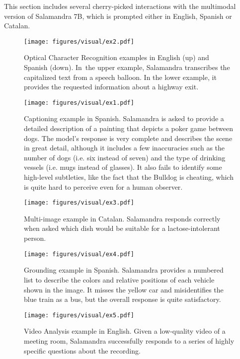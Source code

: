 This section includes several cherry-picked interactions with the multimodal version of Salamandra 7B, which is prompted either in English, Spanish or Catalan.

\begin{figure}[htp]
    \centering
    \texttt{[image: figures/visual/ex2.pdf]}
    \caption{Optical Character Recognition examples in English (up) and Spanish (down). \hbox{In the} upper example, Salamandra transcribes the capitalized text from a speech balloon. In the lower example, it provides the requested information about a highway exit.}
    \label{fig:visual_ex2}
\end{figure}

\begin{figure}[htp]
    \centering
    \texttt{[image: figures/visual/ex1.pdf]}
    \caption{Captioning example in Spanish. Salamandra is asked to provide a detailed description of a painting that depicts a poker game between dogs. The model's response is very complete and describes the scene in great detail, although it includes a few inaccuracies such as the number of dogs (i.e. six instead of seven) and the type of drinking vessels (i.e. mugs instead of glasses). It also fails to identify some high-level subtleties, like the fact that the Bulldog is cheating, which is quite hard to perceive even for a human observer.}
    \label{fig:visual_ex1}
\end{figure}

\begin{figure}[htp]
    \centering
    \texttt{[image: figures/visual/ex3.pdf]}
    \caption{Multi-image example in Catalan. Salamandra responds correctly when asked which dish would be suitable for a lactose-intolerant person.}
    \label{fig:visual_ex3}
\end{figure}

\begin{figure}[htp]
    \centering
    \texttt{[image: figures/visual/ex4.pdf]}
    \caption{Grounding example in Spanish. Salamandra provides a numbered list to describe the colors and relative positions of each vehicle shown in the image. It misses the yellow car and misidentifies the blue train as a bus, but the overall response is quite satisfactory.}
    \label{fig:visual_ex4}
\end{figure}

\begin{figure}[htp]
    \centering
    \texttt{[image: figures/visual/ex5.pdf]}
    \caption{Video Analysis example in English. Given a low-quality video of a meeting room, Salamandra successfully responds to a series of highly specific questions about the recording.}
    \label{fig:visual_ex5}
\end{figure}